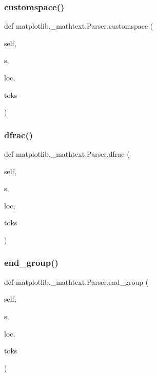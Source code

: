 \subsubsection{\texorpdfstring{customspace()}{customspace()}}
{\footnotesize\ttfamily def matplotlib.\+\_\+mathtext.\+Parser.\+customspace (\begin{DoxyParamCaption}\item[{}]{self,  }\item[{}]{s,  }\item[{}]{loc,  }\item[{}]{toks }\end{DoxyParamCaption})}

\mbox{\label{classmatplotlib_1_1__mathtext_1_1Parser_a2d09869b69b9dbf0496d668f82edf6f2}} 
\subsubsection{\texorpdfstring{dfrac()}{dfrac()}}
{\footnotesize\ttfamily def matplotlib.\+\_\+mathtext.\+Parser.\+dfrac (\begin{DoxyParamCaption}\item[{}]{self,  }\item[{}]{s,  }\item[{}]{loc,  }\item[{}]{toks }\end{DoxyParamCaption})}

\mbox{\label{classmatplotlib_1_1__mathtext_1_1Parser_a9495df696d925a7a175c91242b725a70}} 
\subsubsection{\texorpdfstring{end\+\_\+group()}{end\_group()}}
{\footnotesize\ttfamily def matplotlib.\+\_\+mathtext.\+Parser.\+end\+\_\+group (\begin{DoxyParamCaption}\item[{}]{self,  }\item[{}]{s,  }\item[{}]{loc,  }\item[{}]{toks }\end{DoxyParamCaption})}


